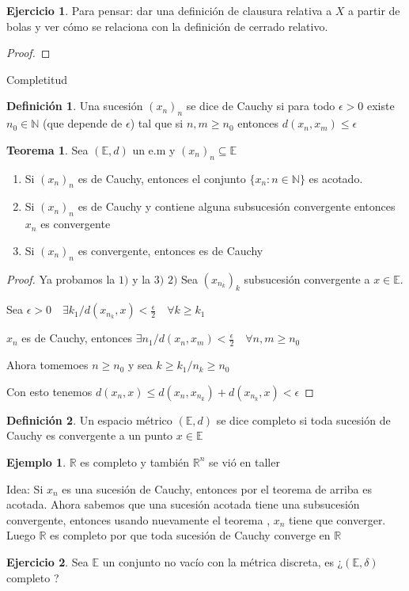 \documentclass[12pt]{article}
\newcommand{\R}{\mathbb{R}}
\newcommand{\E}{\mathbb{E}}
\newcommand{\N}{\mathbb{N}}
\theoremstyle{definition}
\newtheorem{definition}{Definición}[section]
\newtheorem{theorem}{Teorema}
\newtheorem{ex}{Ejemplo}
\newtheorem{ej}{Ejercicio}
\begin{document}
\begin{ej}
  Para pensar: dar una definición de clausura relativa a $X$ a partir de bolas y ver cómo se relaciona con la definición de cerrado relativo.
  \begin{proof}
    
  \end{proof}
\end{ej}

\newpage
Completitud
\newpage


\begin{definition}
  Una sucesión $(x_n)_n$ se dice de Cauchy si para todo $\epsilon > 0$ existe $n_0 \in \N$ (que depende de $\epsilon$) tal que si $n,m \geq n_0$ entonces $d(x_n,x_m) \leq \epsilon$ 
\end{definition}

\begin{theorem}
  Sea $(\E,d)$ un e.m y $(x_n)_n \subseteq \E$
  \begin{enumerate}
    \item Si $(x_n)_n$ es de Cauchy, entonces el conjunto $\{x_n : n \in \N \}$ es acotado.
      \item Si $(x_n)_n$ es de Cauchy y contiene alguna subsucesión convergente entonces $x_n$ es convergente
      \item Si $(x_n)_n$ es convergente, entonces es de Cauchy
  \end{enumerate}
  \begin{proof}
Ya probamos la $1)$ y la $3)$
  $2)$ Sea $(x_{n_k})_k$ subsucesión convergente a $ x \in \E$.

  Sea $\epsilon >0 \quad \exists k_1 / d(x_{n_k},x) < \frac{\epsilon}{2} \quad \forall k \geq k_1$

  $x_n$ es de Cauchy, entonces $\exists n_1 / d(x_n,x_m) < \frac{\epsilon}{2} \quad \forall n,m \geq n_0$

  Ahora tomemoes $n \geq n_0$ y sea $k \geq k_1 / n_{k} \geq n_0$

  Con esto tenemos $d(x_n,x) \leq d(x_n,x_{n_{k}}) + d(x_{n_{k}},x) < \epsilon$
  \end{proof}
\end{theorem}
\begin{definition}
  Un espacio métrico $(\E,d)$ se dice completo si toda sucesión de Cauchy es convergente a un punto $x \in \E$ 
\end{definition}
\begin{ex}
  $\R$ es completo y también $\R^n$ se vió en taller

  Idea: Si $x_n$ es una sucesión de Cauchy, entonces por el teorema de arriba es acotada. Ahora sabemos que una sucesión acotada tiene una subsucesión convergente, entonces usando nuevamente el teorema , $x_n$ tiene que converger. Luego $\R$ es completo por que toda sucesión de Cauchy converge en $\R$ 
\end{ex}
\begin{ej}
  Sea $\E$ un conjunto no vacío con la métrica discreta, es ¿$(\E,\delta) $ completo ?
\end{ej}
\end{document}
